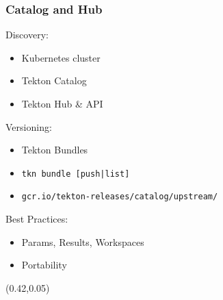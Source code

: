 \documentclass[aspectratio=169,11pt,hyperref={colorlinks=true}]{beamer}
\begin{document}
\begin{grayframe}
  \frametitle{Catalog and Hub}
  Discovery:
  \begin{itemize}
    \item Kubernetes cluster
    \item Tekton Catalog
    \item Tekton Hub \& API
  \end{itemize}
  \vspace{0.03\paperheight}
  Versioning:
  \begin{itemize}
    \item Tekton Bundles
    \item \texttt{tkn bundle [push|list]}
    \item \texttt{gcr.io/tekton-releases/catalog/upstream/}
  \end{itemize}
  \vspace{0.03\paperheight}
  Best Practices:
  \begin{itemize}
    \item Params, Results, Workspaces %
    \item Portability %
  \end{itemize}
  \begin{textblock*}{0.4\paperwidth}(0.42\paperwidth,0.05\paperheight)

\end{textblock*}
\end{grayframe}
\end{document}
